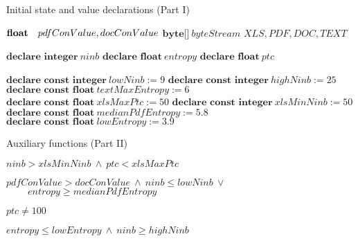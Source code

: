 \documentclass{article}
\begin{document}
\begin{algorithm}
\caption{Initial state and value declarations (Part I)}
\begin{algorithmic}[1]

\Require$\newline \textbf{float} \ \ \ pdfConValue, docConValue$ 
 $\textbf{byte[]} \   byteStream$
\newline
\Ensure$XLS, PDF, DOC, TEXT$
\newline



\State$\textbf{declare integer} \ ninb$
\State$\textbf{declare float} \ entropy$
\State$\textbf{declare float} \ ptc$
\newline

\State$\textbf{declare const integer} \ lowNinb:= 9$
\State$\textbf{declare const integer} \ highNinb:= 25$
\State$\textbf{declare const float} \ textMaxEntropy:= 6 $
\State$\textbf{declare const float} \ xlsMaxPtc:= 50$
\State$\textbf{declare const integer} \ xlsMinNinb:= 50$
\State$\textbf{declare const float} \ medianPdfEntropy:= 5.8$
\State$\textbf{declare const float} \ lowEntropy:= 3.9$



\end{algorithmic}
\end{algorithm}

\begin{algorithm}[h]
\caption*{Auxiliary functions (Part II)}
\begin{algorithmic}[1]

    \State \Return $ninb > xlsMinNinb \ \land \ ptc < xlsMaxPtc$
\EndFunction
\newline

    \State \Return $pdfConValue > docConValue \ \land \ ninb \leq lowNinb \ \lor$
     \State $\ \ \ \ \ \ \ \ \  \  entropy \geq medianPdfEntropy$
\EndFunction
\newline

    \State \Return $ptc \neq 100$
\EndFunction
\newline

    \State \Return $entropy \leq lowEntropy \ \land \ ninb \geq highNinb$
\EndFunction

\end{algorithmic}
\end{algorithm}
\end{document}
